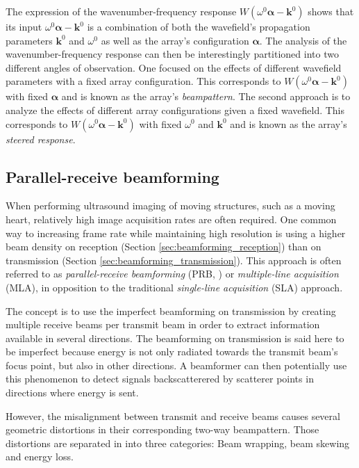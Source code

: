 The expression of the wavenumber-frequency response $W(\omega^0 \boldsymbol{\alpha} - \boldsymbol{k}^0)$ shows that its input $\omega^0 \boldsymbol{\alpha} - \boldsymbol{k}^0$ is a combination of both the wavefield's propagation parameters $\boldsymbol{k}^0$ and $\omega^0$ as well as the array's configuration $\boldsymbol{\alpha}$.
The analysis of the wavenumber-frequency response can then be interestingly partitioned into two different angles of observation.
One focused on the effects of different wavefield parameters with a fixed array configuration. This corresponds to $W(\omega^0 \boldsymbol{\alpha} - \boldsymbol{k}^0)$ with fixed $\boldsymbol{\alpha}$ and is known as the array's \textit{beampattern}.
The second approach is to analyze the effects of different array configurations given a fixed wavefield. This corresponds to $W(\omega^0 \boldsymbol{\alpha} - \boldsymbol{k}^0)$ with fixed  $\omega^0$ and $\boldsymbol{k}^0$ and is known as the array's \textit{steered response}.


\subsection{Parallel-receive beamforming}
\label{sec:prb}
When performing ultrasound imaging of moving structures, such as a moving heart, relatively high image acquisition rates are often required.
One common way to increasing frame rate while maintaining high resolution is using a higher beam density on reception (Section \ref{sec:beamforming_reception}) than on transmission (Section \ref{sec:beamforming_transmission}). 
This approach is often referred to as \textit{parallel-receive beamforming} (PRB, \cite{prb_approaches}) or \textit{multiple-line acquisition} (MLA), in opposition to the traditional \textit{single-line acquisition} (SLA) approach.

The concept is to use the imperfect beamforming on transmission by creating multiple receive beams per transmit beam in order to extract information available in several directions. The beamforming on transmission is said here to be imperfect because energy is not only radiated towards the transmit beam's focus point, but also in other directions. A beamformer can then potentially use this phenomenon to detect signals backscatterered by scatterer points in directions where energy is sent.

However, the misalignment between transmit and receive beams causes several geometric distortions in their corresponding two-way beampattern.
Those distortions are separated in \cite{prb_approaches} into three categories: Beam wrapping, beam skewing and energy loss.

